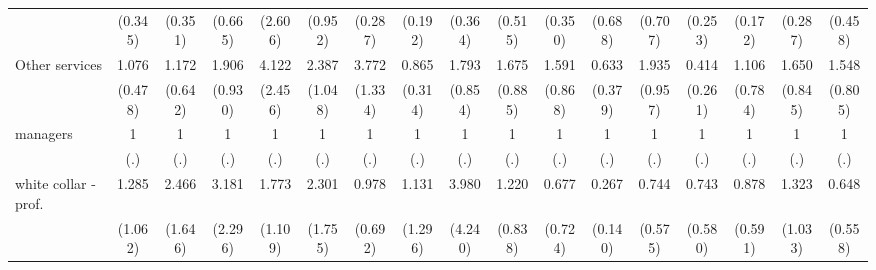 {\begin{tabular}{l*{16}{c}}
                    &     (0.345)         &     (0.351)         &     (0.665)         &     (2.606)         &     (0.952)         &     (0.287)         &     (0.192)         &     (0.364)         &     (0.515)         &     (0.350)         &     (0.688)         &     (0.707)         &     (0.253)         &     (0.172)         &     (0.287)         &     (0.458)         \\
[1em]
Other services      &       1.076         &       1.172         &       1.906         &       4.122\sym{*}  &       2.387\sym{*}  &       3.772\sym{***}&       0.865         &       1.793         &       1.675         &       1.591         &       0.633         &       1.935         &       0.414         &       1.106         &       1.650         &       1.548         \\
                    &     (0.478)         &     (0.642)         &     (0.930)         &     (2.456)         &     (1.048)         &     (1.334)         &     (0.314)         &     (0.854)         &     (0.885)         &     (0.868)         &     (0.379)         &     (0.957)         &     (0.261)         &     (0.784)         &     (0.845)         &     (0.805)         \\
[1em]
managers            &           1         &           1         &           1         &           1         &           1         &           1         &           1         &           1         &           1         &           1         &           1         &           1         &           1         &           1         &           1         &           1         \\
                    &         (.)         &         (.)         &         (.)         &         (.)         &         (.)         &         (.)         &         (.)         &         (.)         &         (.)         &         (.)         &         (.)         &         (.)         &         (.)         &         (.)         &         (.)         &         (.)         \\
[1em]
white collar - prof.&       1.285         &       2.466         &       3.181         &       1.773         &       2.301         &       0.978         &       1.131         &       3.980         &       1.220         &       0.677         &       0.267\sym{*}  &       0.744         &       0.743         &       0.878         &       1.323         &       0.648         \\
                    &     (1.062)         &     (1.646)         &     (2.296)         &     (1.109)         &     (1.755)         &     (0.692)         &     (1.296)         &     (4.240)         &     (0.838)         &     (0.724)         &     (0.140)         &     (0.575)         &     (0.580)         &     (0.591)         &     (1.033)         &     (0.558)         \\

\end{tabular}}
